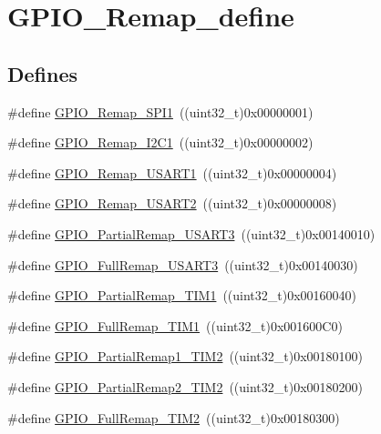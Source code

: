\hypertarget{group__GPIO__Remap__define}{
\section{GPIO\_\-Remap\_\-define}
\label{group__GPIO__Remap__define}
}
\subsection*{Defines}
\begin{DoxyCompactItemize}
\item 
\#define \hyperlink{group__GPIO__Remap__define_ga58b02a04a6041954c6e99e681716ab4c}{GPIO\_\-Remap\_\-SPI1}~((uint32\_\-t)0x00000001)
\item 
\#define \hyperlink{group__GPIO__Remap__define_ga6cf601e6db62cb2e9dbbccb276401b18}{GPIO\_\-Remap\_\-I2C1}~((uint32\_\-t)0x00000002)
\item 
\#define \hyperlink{group__GPIO__Remap__define_ga804d946c5ca246a1f02f73a086586fd6}{GPIO\_\-Remap\_\-USART1}~((uint32\_\-t)0x00000004)
\item 
\#define \hyperlink{group__GPIO__Remap__define_gaeb2ebb12e23138509af20dce1fc6c246}{GPIO\_\-Remap\_\-USART2}~((uint32\_\-t)0x00000008)
\item 
\#define \hyperlink{group__GPIO__Remap__define_ga97af4aa8dded530353160cca615ad201}{GPIO\_\-PartialRemap\_\-USART3}~((uint32\_\-t)0x00140010)
\item 
\#define \hyperlink{group__GPIO__Remap__define_gaa8831190b5b68e9f871955b791fa358b}{GPIO\_\-FullRemap\_\-USART3}~((uint32\_\-t)0x00140030)
\item 
\#define \hyperlink{group__GPIO__Remap__define_ga0e94344776c53a76f6e9d933139c05a6}{GPIO\_\-PartialRemap\_\-TIM1}~((uint32\_\-t)0x00160040)
\item 
\#define \hyperlink{group__GPIO__Remap__define_gaf1f2d5cbc2281b3e3a6cc51c3fe7f77f}{GPIO\_\-FullRemap\_\-TIM1}~((uint32\_\-t)0x001600C0)
\item 
\#define \hyperlink{group__GPIO__Remap__define_ga7ad69d3e2643b2bfee4eebbea4a5b80e}{GPIO\_\-PartialRemap1\_\-TIM2}~((uint32\_\-t)0x00180100)
\item 
\#define \hyperlink{group__GPIO__Remap__define_ga42908e73dfc201d0a7b4ab0ed6f15eb7}{GPIO\_\-PartialRemap2\_\-TIM2}~((uint32\_\-t)0x00180200)
\item 
\#define \hyperlink{group__GPIO__Remap__define_ga2bd999e77236155935d2a598d4bac2a9}{GPIO\_\-FullRemap\_\-TIM2}~((uint32\_\-t)0x00180300)
\item 

\end{DoxyCompactItemize}
